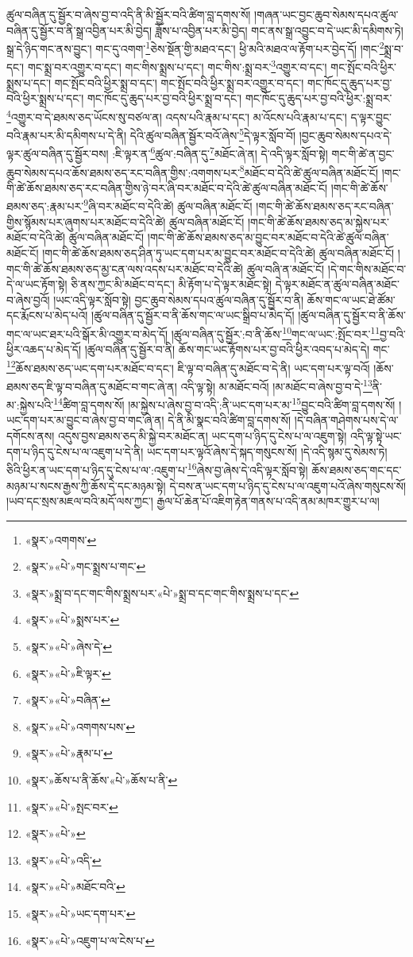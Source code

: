 ཚུལ་བཞིན་དུ་སྦྱོར་བ་ཞེས་བྱ་བ་འདི་ནི་མི་སྦྱོར་བའི་ཚིག་བླ་དགས་སོ། །གཞན་ཡང་བྱང་ཆུབ་སེམས་དཔའ་ཚུལ་བཞིན་དུ་སྦྱོར་བ་ནི་སྒྲ་འབྱིན་པར་མི་བྱེད། ཟློས་པ་འབྱིན་པར་མི་བྱེད། གང་ནས་སྒྲ་འབྱུང་བ་དེ་ཡང་མི་དམིགས་ཏེ། སྒྲ་དེ་ཉིད་གང་ནས་བྱུང་། གང་དུ་འགག་\footnote{«སྣར་»འགགས་}ཅེས་སྔོན་གྱི་མཐའ་དང་། ཕྱི་མའི་མཐའ་ལ་རྟོག་པར་བྱེད་དོ། །གང་\footnote{«སྣར་»«པེ་»གང་སྨྲས་པ་གང་}སྨྲ་བ་དང་། གང་སྨྲ་བར་འགྱུར་བ་དང་། གང་གིས་སྨྲས་པ་དང་། གང་གིས་:སྨྲ་བར་\footnote{«སྣར་»སྨྲ་བ་དང་གང་གིས་སྨྲས་པར་«པེ་»སྨྲ་བ་དང་གང་གིས་སྨྲས་པ་དང་}འགྱུར་བ་དང་། གང་སྤོང་བའི་ཕྱིར་སྨྲས་པ་དང་། གང་སྤོང་བའི་ཕྱིར་སྨྲ་བ་དང་། གང་སྤོང་བའི་ཕྱིར་སྨྲ་བར་འགྱུར་བ་དང་། གང་ཁོང་དུ་ཆུད་པར་བྱ་བའི་ཕྱིར་སྨྲས་པ་དང་། གང་ཁོང་དུ་ཆུད་པར་བྱ་བའི་ཕྱིར་སྨྲ་བ་དང་། གང་ཁོང་དུ་ཆུད་པར་བྱ་བའི་ཕྱིར་:སྨྲ་བར་\footnote{«སྣར་»«པེ་»སྨས་པར་}འགྱུར་བ་དེ་ཐམས་ཅད་ཡོངས་སུ་བཙལ་ན། འདས་པའི་རྣམ་པ་དང་། མ་འོངས་པའི་རྣམ་པ་དང་། ད་ལྟར་བྱུང་བའི་རྣམ་པར་མི་དམིགས་པ་དེ་ནི། དེའི་ཚུལ་བཞིན་སྦྱོར་བའོ་ཞེས་\footnote{«སྣར་»«པེ་»ཞེས་དེ་}དེ་ལྟར་སློབ་བོ། །བྱང་ཆུབ་སེམས་དཔའ་དེ་ལྟར་ཚུལ་བཞིན་དུ་སྦྱོར་བས། :ཇི་ལྟར་ན་\footnote{«སྣར་»«པེ་»ཇི་ལྟར་}ཚུལ་:བཞིན་དུ་\footnote{«སྣར་»«པེ་»བཞིན་}མཐོང་ཞེ་ན། དེ་འདི་ལྟར་སློབ་སྟེ། གང་གི་ཚེ་ན་བྱང་ཆུབ་སེམས་དཔའ་ཆོས་ཐམས་ཅད་རང་བཞིན་གྱིས་:འགགས་པར་\footnote{«སྣར་»«པེ་»འགགས་པས་}མཐོང་བ་དེའི་ཚེ་ཚུལ་བཞིན་མཐོང་ངོ། །གང་གི་ཚེ་ཆོས་ཐམས་ཅད་རང་བཞིན་གྱིས་ཉེ་བར་ཞི་བར་མཐོང་བ་དེའི་ཚེ་ཚུལ་བཞིན་མཐོང་ངོ། །གང་གི་ཚེ་ཆོས་ཐམས་ཅད་:རྣམ་པར་\footnote{«སྣར་»«པེ་»རྣམ་པ་}ཞི་བར་མཐོང་བ་དེའི་ཚེ། ཚུལ་བཞིན་མཐོང་ངོ། །གང་གི་ཚེ་ཆོས་ཐམས་ཅད་རང་བཞིན་གྱིས་སྙོམས་པར་ཞུགས་པར་མཐོང་བ་དེའི་ཚེ། ཚུལ་བཞིན་མཐོང་ངོ། །གང་གི་ཚེ་ཆོས་ཐམས་ཅད་མ་སྐྱེས་པར་མཐོང་བ་དེའི་ཚེ། ཚུལ་བཞིན་མཐོང་ངོ། །གང་གི་ཚེ་ཆོས་ཐམས་ཅད་མ་བྱུང་བར་མཐོང་བ་དེའི་ཚེ་ཚུལ་བཞིན་མཐོང་ངོ། །གང་གི་ཚེ་ཆོས་ཐམས་ཅད་ཤིན་ཏུ་ཡང་དག་པར་མ་བྱུང་བར་མཐོང་བ་དེའི་ཚེ། ཚུལ་བཞིན་མཐོང་ངོ། །གང་གི་ཚེ་ཆོས་ཐམས་ཅད་མྱ་ངན་ལས་འདས་པར་མཐོང་བ་དེའི་ཚེ། ཚུལ་བཞི་ན་མཐོང་ངོ། །དེ་གང་གིས་མཐོང་བ་དེ་ལ་ཡང་རྟོག་སྟེ། ཅི་ནས་ཀྱང་མི་མཐོང་བ་དང་། མི་རྟོག་པ་དེ་ལྟར་མཐོང་སྟེ། དེ་ལྟར་མཐོང་ན་ཚུལ་བཞིན་མཐོང་བ་ཞེས་བྱའོ། །ཡང་འདི་ལྟར་སློབ་སྟེ། བྱང་ཆུབ་སེམས་དཔའ་ཚུལ་བཞིན་དུ་སྦྱོར་བ་ནི། ཆོས་གང་ལ་ཡང་ཐེ་ཚོམ་དང་རྨོངས་པ་མེད་པའོ། །ཚུལ་བཞིན་དུ་སྦྱོར་བ་ནི་ཆོས་གང་ལ་ཡང་སྒྲིབ་པ་མེད་དོ། །ཚུལ་བཞིན་དུ་སྦྱོར་བ་ནི་ཆོས་གང་ལ་ཡང་ཐར་པའི་སྒོར་མི་འགྱུར་བ་མེད་དོ། །ཚུལ་བཞིན་དུ་སྦྱོར་:བ་ནི་ཆོས་\footnote{«སྣར་»ཆོས་པ་ནི་ཆོས་«པེ་»ཆོས་པ་ནི་}གང་ལ་ཡང་:སྤོང་བར་\footnote{«སྣར་»«པེ་»སྤང་བར་}བྱ་བའི་ཕྱིར་འཆད་པ་མེད་དོ། །ཚུལ་བཞིན་དུ་སྦྱོར་བ་ནི། ཆོས་གང་ཡང་རྟོགས་པར་བྱ་བའི་ཕྱིར་འབད་པ་མེད་དེ། གང་\footnote{«སྣར་»«པེ་»}ཆོས་ཐམས་ཅད་ཡང་དག་པར་མཐོང་བ་དང་། ཇི་ལྟ་བ་བཞིན་དུ་མཐོང་བ་དེ་ནི། ཡང་དག་པར་ལྟ་བའོ། །ཆོས་ཐམས་ཅད་ཇི་ལྟ་བ་བཞིན་དུ་མཐོང་བ་གང་ཞེ་ན། འདི་ལྟ་སྟེ། མ་མཐོང་བའོ། །མ་མཐོང་བ་ཞེས་བྱ་བ་དེ་\footnote{«སྣར་»«པེ་»འདི་}ནི་མ་:སྐྱེས་པའི་\footnote{«སྣར་»«པེ་»མཐོང་བའི་}ཚིག་བླ་དགས་སོ། །མ་སྐྱེས་པ་ཞེས་བྱ་བ་འདི་:ནི་ཡང་དག་པར་མ་\footnote{«སྣར་»«པེ་»ཡང་དག་པར་}བྱུང་བའི་ཚིག་བླ་དགས་སོ། །ཡང་དག་པར་མ་བྱུང་བ་ཞེས་བྱ་བ་གང་ཞེ་ན། དེ་ནི་མི་སྣང་བའི་ཚིག་བླ་དགས་སོ། །དེ་བཞིན་གཤེགས་པས་དེ་ལ་དགོངས་ནས། འདུས་བྱས་ཐམས་ཅད་མི་སྐྱེ་བར་མཐོང་ན། ཡང་དག་པ་ཉིད་དུ་ངེས་པ་ལ་འཇུག་སྟེ། འདི་ལྟ་སྟེ་ཡང་དག་པ་ཉིད་དུ་ངེས་པ་ལ་འཇུག་པ་དེ་ནི། ཡང་དག་པར་ལྟའོ་ཞེས་དེ་སྐད་གསུངས་སོ། །དེ་འདི་སྙམ་དུ་སེམས་ཏེ། ཅིའི་ཕྱིར་ན་ཡང་དག་པ་ཉིད་དུ་ངེས་པ་ལ་:འཇུག་པ་\footnote{«སྣར་»«པེ་»འཇུག་པ་ལ་ངེས་པ་}ཞེས་བྱ་ཞེས་དེ་འདི་ལྟར་སློབ་སྟེ། ཆོས་ཐམས་ཅད་གང་དང་མཉམ་པ་སངས་རྒྱས་ཀྱི་ཆོས་དེ་དང་མཉམ་སྟེ། དེ་བས་ན་ཡང་དག་པ་ཉིད་དུ་ངེས་པ་ལ་འཇུག་པའོ་ཞེས་གསུངས་སོ། །ཡབ་དང་སྲས་མཇལ་བའི་མདོ་ལས་ཀྱང་། རྒྱལ་པོ་ཆེན་པོ་འཇིག་རྟེན་གནས་པ་འདི་ནམ་མཁར་གྱུར་པ་ལ། 